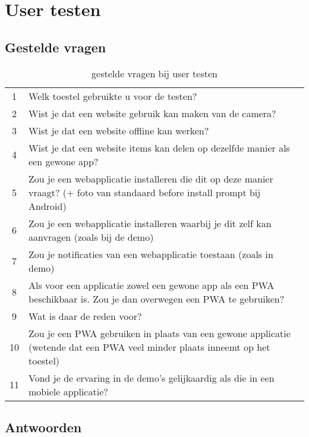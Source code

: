 \chapter{User testen }
\label{ch:userTesten}

\section{Gestelde vragen}

\begin{table}[H]
	\centering
	\begin{tabular}{cp{12cm}}
		1 &  Welk toestel gebruikte u voor de testen? \\
		2 &  Wist je dat een website gebruik kan maken van de camera? \\
		3 &  Wist je dat een website offline kan werken? \\
		4 &  Wist je dat een website items kan delen op dezelfde manier als een gewone app?\\
		5 &  Zou je een webapplicatie installeren die dit op deze manier vraagt?  (+ foto van standaard before install prompt bij Android) \\
		6 &  Zou je een webapplicatie installeren waarbij je dit zelf kan aanvragen (zoals bij de demo) \\
		7 &  Zou je notificaties van een webapplicatie toestaan (zoals in demo) \\
		8 &  Als voor een applicatie zowel een gewone app als een PWA beschikbaar is. Zou je dan overwegen een PWA te gebruiken? \\
		9 &  Wat is daar de reden voor?  \\
		10 &  Zou je een PWA gebruiken in plaats van een gewone applicatie (wetende dat een PWA veel minder plaats inneemt op het toestel) \\
		11 &  Vond je de ervaring in de demo's gelijkaardig als die in een mobiele applicatie? \\
	\end{tabular}	
	\caption{gestelde vragen bij user testen}
\end{table}

\section{Antwoorden}

